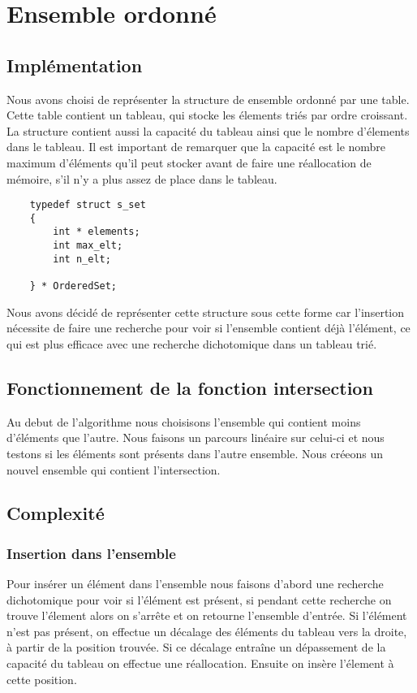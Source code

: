 \documentclass{article}
\author{
    CHRISTOFFEL, Quentin
    \and
    NASSABAIN, Marco
}
\begin{document}
\section{Ensemble ordonné}

    \subsection{Implémentation}
    Nous avons choisi de représenter
    la structure de ensemble ordonné par une table.
    Cette table contient un tableau, qui stocke les
    élements triés par ordre croissant. La structure contient aussi
    la capacité du tableau ainsi que le nombre d'élements dans le tableau.
    Il est important de remarquer que la capacité est le
    nombre maximum d'éléments qu'il peut stocker
    avant de faire une réallocation de mémoire, s'il n'y a plus assez
    de place dans le tableau.

    \begin{verbatim}
    typedef struct s_set
    {
        int * elements;
        int max_elt;
        int n_elt;

    } * OrderedSet;
    \end{verbatim}

    Nous avons décidé de représenter cette structure sous cette forme
    car l'insertion nécessite de faire une recherche
    pour voir si l'ensemble contient déjà l'élément, ce qui est plus
    efficace avec une recherche dichotomique dans un tableau trié.

    \subsection{Fonctionnement de la fonction intersection}
    Au debut de l'algorithme nous choisisons l'ensemble qui contient moins
    d'éléments que l'autre. Nous faisons un parcours linéaire sur celui-ci
    et nous testons si les éléments sont présents dans l'autre ensemble.
    Nous créeons un nouvel ensemble qui contient l'intersection.

    \subsection{Complexité}

        \subsubsection{Insertion dans l'ensemble}
        Pour insérer un élément dans l'ensemble nous faisons d'abord une
        recherche dichotomique pour voir si l'élément est présent, si
        pendant cette recherche on trouve l'élement alors on s'arrête et
        on retourne l'ensemble d'entrée. Si l'élément n'est pas présent,
        on effectue un décalage des éléments du tableau vers la droite,
        à partir de la position trouvée. Si ce décalage entraîne un dépassement
        de la capacité du tableau on effectue une réallocation.
        Ensuite on insère l'élement à cette position.\\
\end{document}
